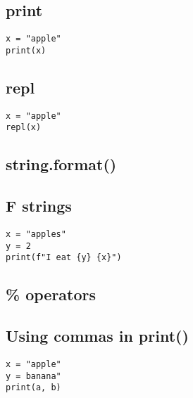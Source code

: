 
\subsection{print}

\begin{verbatim}
x = "apple"
print(x)
\end{verbatim}

\subsection{repl}

\begin{verbatim}
x = "apple"
repl(x)
\end{verbatim}

\subsection{string.format()}

\subsection{F strings}

\begin{verbatim}
x = "apples"
y = 2
print(f"I eat {y} {x}")
\end{verbatim}

\subsection{\% operators}

\subsection{Using commas in print()}

\begin{verbatim}
x = "apple"
y = banana"
print(a, b)
\end{verbatim}

